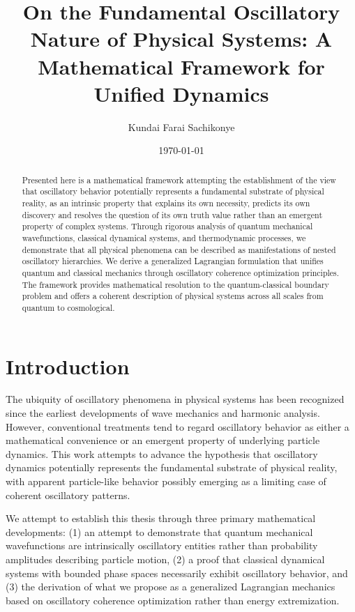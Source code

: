 \documentclass[11pt]{article}
\title{On the Fundamental Oscillatory Nature of Physical Systems: A Mathematical Framework for Unified Dynamics}
\author{Kundai Farai Sachikonye}
\date{\today}
\theoremstyle{remark}
\begin{document}
\maketitle

\begin{abstract}
Presented here is  a mathematical framework attempting the  establishment of the view that oscillatory behavior potentially represents a fundamental substrate of physical reality, as an intrinsic property that explains its own necessity, predicts its own discovery and resolves the question of its own truth value rather than an emergent property of complex systems. Through rigorous analysis of quantum mechanical wavefunctions, classical dynamical systems, and thermodynamic processes, we demonstrate that all physical phenomena can be described as manifestations of nested oscillatory hierarchies. We derive a generalized Lagrangian formulation that unifies quantum and classical mechanics through oscillatory coherence optimization principles. The framework provides mathematical resolution to the quantum-classical boundary problem and offers a coherent description of physical systems across all scales from quantum to cosmological.
\end{abstract}

\section{Introduction}

The ubiquity of oscillatory phenomena in physical systems has been recognized since the earliest developments of wave mechanics and harmonic analysis. However, conventional treatments tend to regard oscillatory behavior as either a mathematical convenience or an emergent property of underlying particle dynamics. This work attempts to advance the hypothesis that oscillatory dynamics potentially represents the fundamental substrate of physical reality, with apparent particle-like behavior possibly emerging as a limiting case of coherent oscillatory patterns.

We attempt to establish this thesis through three primary mathematical developments: (1) an attempt to demonstrate that quantum mechanical wavefunctions are intrinsically oscillatory entities rather than probability amplitudes describing particle motion, (2) a proof that classical dynamical systems with bounded phase spaces necessarily exhibit oscillatory behavior, and (3) the derivation of what we propose as a generalized Lagrangian mechanics based on oscillatory coherence optimization rather than energy extremization.
\end{document}
